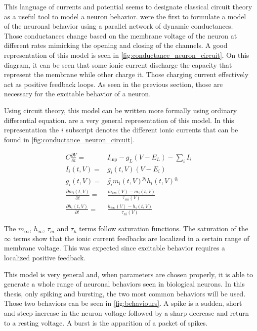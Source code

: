 This language of currents and potential seems to designate classical circuit theory as a useful tool to model a neuron behavior.
\citet{conductanceModel} were the first to formulate a model of the neuronal behavior using a parallel network of dynamic conductances. 
Those conductances change based on the membrane voltage of the neuron at different rates mimicking the opening and closing of the channels. 
A good representation of this model is seen in \cref{fig:conductance_neuron_circuit}. 
On this diagram, it can be seen that some ionic current discharge the capacity that represent the membrane while other charge it. 
Those charging current effectively act as positive feedback loops. 
As seen in the previous section, those are necessary for the excitable behavior of a neuron.

Using circuit theory, this model can be written more formally using ordinary differential equation. 
 are a very general representation of this model.
In this representation the $i$ subscript denotes the different ionic currents that can be found in \cref{fig:conductance_neuron_circuit}.

\begin{align}
    C\frac{\partial V}{\partial t} =& I_\text{inp} - g_L\left(V-E_L\right) - \sum_i I_i\label{eq:hodgkinstart}\\
    I_i\left(t, V\right) =& g_i\left(t, V\right)\left(V - E_i\right)\\
    g_i\left(t, V\right) =& \bar{g_i}m_i\left(t, V\right)^{p_i} h_i\left(t, V\right)^{q_i}\\
    \frac{\partial m_i\left(t, V\right)}{\partial t} =& \frac{m_{i\infty}\left(V\right) - m_i\left(t, V\right)}{\tau_{mi}\left(V\right)}\\
    \frac{\partial h_i\left(t, V\right)}{\partial t} =& \frac{h_{i\infty}\left(V\right) - h_i\left(t, V\right)}{\tau_{hi}\left(V\right)}\label{eq:hodgkinend}
\end{align}

The $m_\infty$, $h_\infty$, $\tau_m$ and $\tau_h$ terms follow saturation functions.
The saturation of the $\infty$ terms show that the ionic current feedbacks are localized in a certain range of membrane voltage.
This was expected since excitable behavior requires a localized positive feedback.


This model is very general and, when parameters are chosen properly, it is able to generate a whole range of neuronal behaviors seen in biological neurons. 
In this thesis, only spiking and bursting, the two most common behaviors will be used. Those two behaviors can be seen in \cref{fig:behaviours}. 
A spike is a sudden, short and steep increase in the neuron voltage followed by a sharp decrease and return to a resting voltage. 
A burst is the apparition of a packet of spikes.


